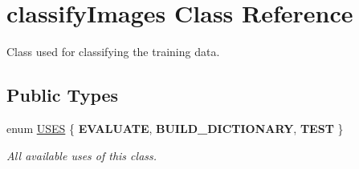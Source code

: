 \hypertarget{classclassifyImages}{
\section{classifyImages Class Reference}
\label{classclassifyImages}
}


Class used for classifying the training data.  


\subsection*{Public Types}
\begin{DoxyCompactItemize}
\item 
enum \hyperlink{classclassifyImages_a7fab19a2fed8c0c376fdb8f7c16abb6b}{USES} \{ {\bfseries EVALUATE}, 
{\bfseries BUILD\_\-DICTIONARY}, 
{\bfseries TEST}
 \}
\begin{DoxyCompactList}\small\item\em All available uses of this class. \item\end{DoxyCompactList}\end{DoxyCompactItemize}
